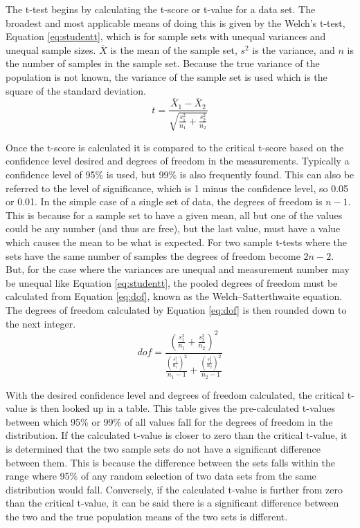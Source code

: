     The t-test begins by calculating the t-score or t-value for a data set.
    The broadest and most applicable means of doing this is given by the Welch's t-test, Equation \ref{eq:studentt}, which is for sample sets with unequal variances and unequal sample sizes.
    $\overline{X}$ is the mean of the sample set, $s^2$ is the variance, and $n$ is the number of samples in the sample set.
    Because the true variance of the population is not known, the variance of the sample set is used which is the square of the standard deviation.
    \begin{equation}
        \label{eq:studentt}
        t=\frac{\overline{X}_1 - \overline{X}_2}{\sqrt{\frac{s^2_1}{n_1}+\frac{s_2^2}{n_2}}}
    \end{equation}

    Once the t-score is calculated it is compared to the critical t-score based on the confidence level desired and degrees of freedom in the measurements.
    Typically a confidence level of 95\% is used, but 99\% is also frequently found.
    This can also be referred to the level of significance, which is 1 minus the confidence level, so 0.05 or 0.01.
    In the simple case of a single set of data, the degrees of freedom is $n-1$.
    This is because for a sample set to have a given mean, all but one of the values could be any number (and thus are free), but the last value, must have a value which causes the mean to be what is expected.
    For two sample t-tests where the sets have the same number of samples the degrees of freedom become $2n-2$.
    But, for the case where the variances are unequal and measurement number may be unequal like Equation \ref{eq:studentt}, the pooled degrees of freedom must be calculated from Equation \ref{eq:dof}, known as the Welch–Satterthwaite equation.
    The degrees of freedom calculated by Equation \ref{eq:dof} is then rounded down to the next integer.
    \begin{equation}
        \label{eq:dof}
        dof=\frac{\left(\frac{s_1^2}{n_1}+\frac{s_2^2}{n_2}\right)^2}{\frac{\left(\frac{s_1^2}{n_1}\right)^2}{n_1-1}+\frac{\left(\frac{s_2^2}{n_2}\right)^2}{n_2-1}}
    \end{equation}

    With the desired confidence level and degrees of freedom calculated, the critical t-value is then looked up in a table.
    This table gives the pre-calculated t-values between which 95\% or 99\% of all values fall for the degrees of freedom in the distribution.
    If the calculated t-value is closer to zero than the critical t-value, it is determined that the two sample sets do not have a significant difference between them.
    This is because the difference between the sets falls within the range where 95\% of any random selection of two data sets from the same distribution would fall.
    Conversely, if the calculated t-value is further from zero than the critical t-value, it can be said there is a significant difference between the two and the true population means of the two sets is different.

